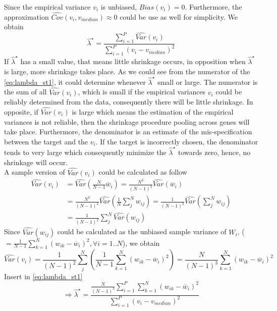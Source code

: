 Since the empirical variance $v_i$ is unbiased, $Bias(v_i) = 0$. Furthermore, the approximation $\widehat{Cov}(v_i, v_{median}) \approx 0$ could be use as well for simplicity. We obtain
\begin{equation} \label{eq:lambda_st1}
	\hat \lambda^\star = \frac{\sum^P_{i=1}\widehat{Var}(v_i)}{\sum^P_{i=1}(v_i - v_{median})^2}
\end{equation}
If $\hat \lambda^\star$ has a small value, that means little shrinkage occurs, in opposition when $\hat \lambda^\star$ is large, more shrinkage takes place. As we could see from the numerator of the \autoref{eq:lambda_st1}, it could determine whenever $\hat \lambda^\star$ small or large. The numerator is the sum of all $\widehat{Var}(v_i)$, which is small if the empirical variances $v_i$ could be reliably determined from the data, consequently there will be little shrinkage. In opposite, if $\widehat{Var}(v_i)$ is large which means the estimation of the empirical variances is not reliable, then the shrinkage procedure pooling across genes will take place. Furthermore, the denominator is an estimate of the mis-specification between the target and the $v_i$. If the target is incorrectly chosen, the denominator tends to very large which consequently minimize the $\hat \lambda^\star$ towards zero, hence, no shrinkage will occur.\\
A sample version of $\widehat{Var}(v_i)$ could be calculated as follow
\begin{align*}
	\widehat{Var}(v_i) &= \widehat{Var}(\frac{N}{N-1}\overline{w}_i) = \frac{N^2}{(N-1)^2}\widehat{Var}(\overline{w}_i) \\
	&= \frac{N^2}{(N-1)^2}\widehat{Var}(\frac{1}{N}\sum^N_j{w_{ij}}) = \frac{1}{(N-1)^2}\widehat{Var}(\sum^N_j{w_{ij}}) \\
	&= \frac{1}{(N-1)^2}\sum^N_j\widehat{Var}({w_{ij}})
\end{align*}
Since $\widehat{Var}(w_{ij})$ could be calculated as the unbiased sample variance of $W_i$, ( $=\frac{1}{N-1}\sum^N_{k=1}(w_{ik} - \overline{w}_i)^2,\forall i=1..N$), we obtain
\begin{equation*}
	\widehat{Var}(v_i) = \frac{1}{(N-1)^2}\sum^N_j\left(\frac{1}{N-1}\sum^N_{k=1}(w_{ik} - \overline{w}_i)^2 \right) = \frac{N}{(N-1)^3}\sum^N_{k=1}(w_{ik} - \overline{w}_i)^2
\end{equation*}
Insert in \autoref{eq:lambda_st1}
\begin{equation} \label{eq:lambda_st2}
	\Rightarrow \hat \lambda^\star = \frac{\frac{N}{(N-1)^3}\sum^P_{i=1}\sum^N_{k=1}(w_{ik} - \overline{w}_i)^2}{\sum^P_{i=1}(v_i - v_{median})^2}	
\end{equation}
